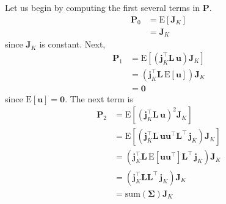 \documentclass[modern]{aastex62}
\begin{document}
Let us begin by computing the first several terms in $\mathbf{P}$.
%
\begin{align}
    \mathbf{P}_0 & = \mathrm{E}\left[ \mathbf{J}_K \right]
    \nonumber                                              \\
                 & = \mathbf{J}_K
\end{align}
%
since $\mathbf{J}_K$ is constant. Next,
%
\begin{align}
    \mathbf{P}_1 & = \mathrm{E}\left[ \left(\mathbf{j}_K^\top \mathbf{L} \, \mathbf{u}\right) \mathbf{J}_K \right]
    \nonumber                                                                                                      \\
                 & = \left(\mathbf{j}_K^\top \mathbf{L} \, \mathrm{E}\left[ \mathbf{u} \right]\right) \mathbf{J}_K
    \nonumber                                                                                                      \\
                 & = \mathbf{0}
\end{align}
%
since $\mathrm{E}\left[ \mathbf{u} \right] = \mathbf{0}$. The next term is
%
\begin{align}
    \mathbf{P}_2 & = \mathrm{E}\left[ \left(\mathbf{j}_K^\top \mathbf{L} \, \mathbf{u}\right)^2 \mathbf{J}_K \right]
    \nonumber                                                                                                                                                         \\
                 & = \mathrm{E}\left[\left(\mathbf{j}_K^\top \mathbf{L} \,  \mathbf{u} \mathbf{u}^\top  \mathbf{L}^\top \, \mathbf{j}_K \right)  \mathbf{J}_K \right]
    \nonumber                                                                                                                                                         \\
                 & = \left(\mathbf{j}_K^\top \mathbf{L} \, \mathrm{E}\left[ \mathbf{u} \mathbf{u}^\top \right] \mathbf{L}^\top \, \mathbf{j}_K \right)  \mathbf{J}_K
    \nonumber                                                                                                                                                         \\
                 & = \left(\mathbf{j}_K^\top \mathbf{L} \mathbf{L}^\top \, \mathbf{j}_K \right)  \mathbf{J}_K
    \nonumber                                                                                                                                                         \\
                 & = \mathrm{sum}(\mathbf{\Sigma}) \mathbf{J}_K
\end{align}
\end{document}
